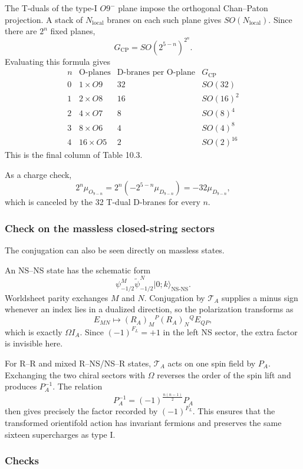 \documentclass[
  10pt,
  a4paper,
  openany]{book}
\begin{document}
The T-duals of the type-I \(O9^-\) plane impose the orthogonal
Chan--Paton projection. A stack of \(N_{\mathrm{local}}\) branes on each
such plane gives \(SO(N_{\mathrm{local}})\). Since there are \(2^n\)
fixed planes, \[
\boxed{
G_{\mathrm{CP}}
=
SO\!\left(2^{5-n}\right)^{2^n}
}.
\] Evaluating this formula gives \[
\begin{array}{c|c|c|c}
n
&
\text{O-planes}
&
\text{D-branes per O-plane}
&
G_{\mathrm{CP}}
\\ \hline
0&1\times O9&32&SO(32)\\
1&2\times O8&16&SO(16)^2\\
2&4\times O7&8&SO(8)^4\\
3&8\times O6&4&SO(4)^8\\
4&16\times O5&2&SO(2)^{16}
\end{array}
\] This is the final column of Table 10.3.

As a charge check, \[
2^n\mu_{O_{9-n}}
=
2^n
\left(
-2^{5-n}\mu_{D_{9-n}}
\right)
=
-32\mu_{D_{9-n}},
\] which is canceled by the 32 T-dual D-branes for every \(n\).

\subsubsection{Check on the massless closed-string
sectors}\label{check-on-the-massless-closed-string-sectors}

The conjugation can also be seen directly on massless states.

An NS--NS state has the schematic form \[
\psi_{-1/2}^M
\widetilde\psi_{-1/2}^N
|0;k\rangle_{\mathrm{NS\text{-}NS}}.
\] Worldsheet parity exchanges \(M\) and \(N\). Conjugation by
\(\mathcal T_A\) supplies a minus sign whenever an index lies in a
dualized direction, so the polarization transforms as \[
E_{MN}
\longmapsto
(R_A)_M{}^P
(R_A)_N{}^Q
E_{QP},
\] which is exactly \(\Omega I_A\). Since \((-1)^{F_L}=+1\) in the left
NS sector, the extra factor is invisible here.

For R--R and mixed R--NS/NS--R states, \(\mathcal T_A\) acts on one spin
field by \(P_A\). Exchanging the two chiral sectors with \(\Omega\)
reverses the order of the spin lift and produces \(P_A^{-1}\). The
relation \[
P_A^{-1}
=
(-1)^{\frac{n(n-1)}2}P_A
\] then gives precisely the factor recorded by \((-1)^{F_L}\). This
ensures that the transformed orientifold action has invariant fermions
and preserves the same sixteen supercharges as type I.

\subsubsection{Checks}\label{checks-19}
\end{document}
